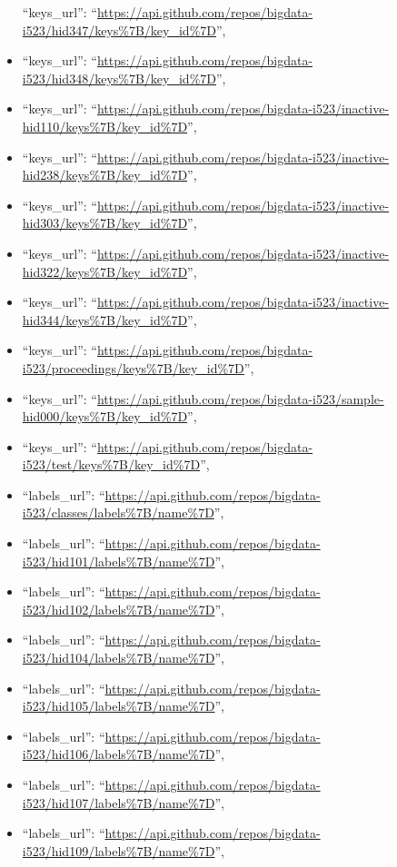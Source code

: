 \begin{itemize}
  ``keys\_url'':
  ``\url{https://api.github.com/repos/bigdata-i523/hid347/keys\%7B/key_id\%7D}'',
\item
  ``keys\_url'':
  ``\url{https://api.github.com/repos/bigdata-i523/hid348/keys\%7B/key_id\%7D}'',
\item
  ``keys\_url'':
  ``\url{https://api.github.com/repos/bigdata-i523/inactive-hid110/keys\%7B/key_id\%7D}'',
\item
  ``keys\_url'':
  ``\url{https://api.github.com/repos/bigdata-i523/inactive-hid238/keys\%7B/key_id\%7D}'',
\item
  ``keys\_url'':
  ``\url{https://api.github.com/repos/bigdata-i523/inactive-hid303/keys\%7B/key_id\%7D}'',
\item
  ``keys\_url'':
  ``\url{https://api.github.com/repos/bigdata-i523/inactive-hid322/keys\%7B/key_id\%7D}'',
\item
  ``keys\_url'':
  ``\url{https://api.github.com/repos/bigdata-i523/inactive-hid344/keys\%7B/key_id\%7D}'',
\item
  ``keys\_url'':
  ``\url{https://api.github.com/repos/bigdata-i523/proceedings/keys\%7B/key_id\%7D}'',
\item
  ``keys\_url'':
  ``\url{https://api.github.com/repos/bigdata-i523/sample-hid000/keys\%7B/key_id\%7D}'',
\item
  ``keys\_url'':
  ``\url{https://api.github.com/repos/bigdata-i523/test/keys\%7B/key_id\%7D}'',
\item
  ``labels\_url'':
  ``\url{https://api.github.com/repos/bigdata-i523/classes/labels\%7B/name\%7D}'',
\item
  ``labels\_url'':
  ``\url{https://api.github.com/repos/bigdata-i523/hid101/labels\%7B/name\%7D}'',
\item
  ``labels\_url'':
  ``\url{https://api.github.com/repos/bigdata-i523/hid102/labels\%7B/name\%7D}'',
\item
  ``labels\_url'':
  ``\url{https://api.github.com/repos/bigdata-i523/hid104/labels\%7B/name\%7D}'',
\item
  ``labels\_url'':
  ``\url{https://api.github.com/repos/bigdata-i523/hid105/labels\%7B/name\%7D}'',
\item
  ``labels\_url'':
  ``\url{https://api.github.com/repos/bigdata-i523/hid106/labels\%7B/name\%7D}'',
\item
  ``labels\_url'':
  ``\url{https://api.github.com/repos/bigdata-i523/hid107/labels\%7B/name\%7D}'',
\item
  ``labels\_url'':
  ``\url{https://api.github.com/repos/bigdata-i523/hid109/labels\%7B/name\%7D}'',

\end{itemize}
